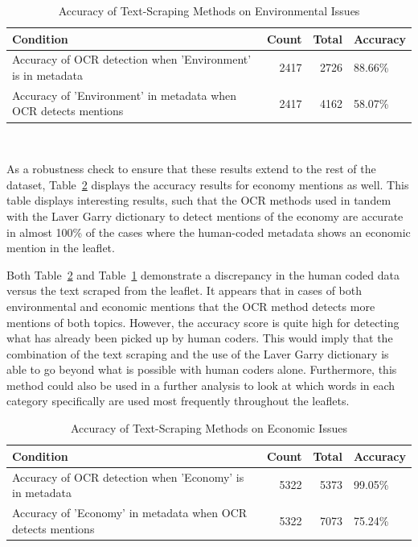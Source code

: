 \documentclass[12pt,letterpaper]{article}
\begin{document}
\begin{table}[!htbp] 
	\centering 
	\captionsetup{justification=centering} %
	\caption{Accuracy of Text-Scraping Methods on Environmental Issues} 
	\label{tab:envaccuracy} 
	\begin{tabular}{lrrl}
		\toprule
		Condition & Count & Total & Accuracy \\
		\midrule
		Accuracy of OCR detection when 'Environment' is in metadata & 2417 & 2726 & 88.66\% \\
		Accuracy of 'Environment' in metadata when OCR detects mentions & 2417 & 4162 & 58.07\% \\
		\bottomrule
	\end{tabular}\\
\end{table}


\vspace{0.5cm}

As a robustness check to ensure that these results extend to the rest of the dataset, Table~\ref{tab:econaccuracy} displays the accuracy results for economy mentions as well. This table displays interesting results, such that the OCR methods used in tandem with the Laver Garry dictionary \autocite{laverEstimatingPolicyPositions2000} to detect mentions of the economy are accurate in almost 100\% of the cases where the human-coded metadata shows an economic mention in the leaflet. 

Both Table~\ref{tab:econaccuracy} and Table~\ref{tab:envaccuracy} demonstrate a discrepancy in the human coded data versus the text scraped from the leaflet. It appears that in cases of both environmental and economic mentions that the OCR method detects more mentions of both topics. However, the accuracy score is quite high for detecting what has already been picked up by human coders. This would imply that the combination of the text scraping and the use of the Laver Garry dictionary is able to go beyond what is possible with human coders alone. Furthermore, this method could also be used in a further analysis to look at which words in each category specifically are used most frequently throughout the leaflets. 


\vspace{1cm}

\begin{table}[!htbp] 
	\centering 
	\captionsetup{justification=centering} %
	\caption{Accuracy of Text-Scraping Methods on Economic Issues} 
	\label{tab:econaccuracy} 
	\begin{tabular}{lrrl}
		\toprule
		Condition & Count & Total & Accuracy \\
		\midrule
		Accuracy of OCR detection when 'Economy' is in metadata & 5322 & 5373 & 99.05\% \\
		Accuracy of 'Economy' in metadata when OCR detects mentions & 5322 & 7073 & 75.24\% \\
		\bottomrule
	\end{tabular}\\
\end{table}
\end{document}
